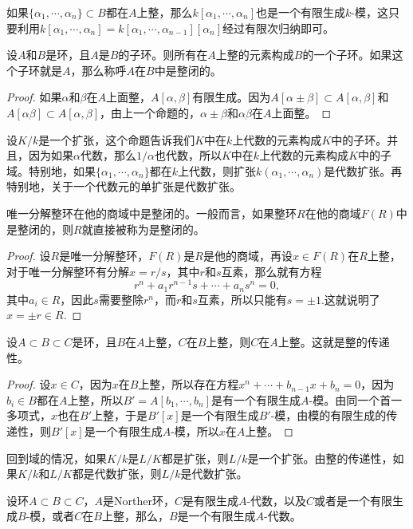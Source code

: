 如果$\{\alpha_1,\cdots,\alpha_n\}\subset B$都在$A$上整，那么$k[\alpha_1,\cdots,\alpha_n]$也是一个有限生成$k$-模，这只要利用$k[\alpha_1,\cdots,\alpha_n]=k[\alpha_1,\cdots,\alpha_{n-1}][\alpha_n]$经过有限次归纳即可。

\para \label{iope}设$A$和$B$是环，且$A$是$B$的子环。则所有在$A$上整的元素构成$B$的一个子环。如果这个子环就是$A$，那么称呼$A$在$B$中是整闭的。

\begin{proof} 如果$\alpha$和$\beta$在$A$上面整，$A[\alpha,\beta]$有限生成。因为$A[\alpha\pm\beta]\subset A[\alpha,\beta]$和$A[\alpha\beta]\subset A[\alpha,\beta]$，由上一个命题的，$\alpha\pm\beta$和$\alpha\beta$在$A$上面整。\end{proof}

设$K/k$是一个扩张，这个命题告诉我们$K$中在$k$上代数的元素构成$K$中的子环。并且，因为如果$\alpha$代数，那么$1/\alpha$也代数，所以$K$中在$k$上代数的元素构成$K$中的子域。特别地，如果$\{\alpha_1,\cdots,\alpha_n\}$都在$k$上代数，则扩张$k(\alpha_1,\cdots,\alpha_n)$是代数扩张。再特别地，关于一个代数元的单扩张是代数扩张。

\para 唯一分解整环在他的商域中是整闭的。一般而言，如果整环$R$在他的商域$F(R)$中是整闭的，则$R$就直接被称为是整闭的。

\begin{proof} 
	设$R$是唯一分解整环，$F(R)$是$R$是他的商域，再设$x\in F(R)$在$R$上整，对于唯一分解整环有分解$x=r/s$，其中$r$和$s$互素，那么就有方程
	\[
		r^n+a_1r^{n-1}s+\cdots+a_n s^n=0,
	\]
	其中$a_i\in R$，因此$s$需要整除$r^n$，而$r$和$s$互素，所以只能有$s=\pm 1$.这就说明了$x=\pm r\in R$.
\end{proof}

\begin{pro}
设$A\subset B\subset C$是环，且$B$在$A$上整，$C$在$B$上整，则$C$在$A$上整。这就是整的传递性。
\end{pro}

\begin{proof} 
	设$x\in C$，因为$x$在$B$上整，所以存在方程$x^n+\cdots+b_{n-1}x+b_n=0$，因为$b_i\in B$都在$A$上整，所以$B'=A[b_1,\cdots,b_n]$是有一个有限生成$A$-模。由同一个首一多项式，$x$也在$B'$上整，于是$B'[x]$是一个有限生成$B'$-模，由模的有限生成的传递性，则$B'[x]$是一个有限生成$A$-模，所以$x$在$A$上整。
\end{proof}

回到域的情况，如果$K/k$是$L/K$都是扩张，则$L/k$是一个扩张。由整的传递性，如果$K/k$和$L/K$都是代数扩张，则$L/k$是代数扩张。

\begin{pro}\label{p:2.4}
设环$A\subset B\subset C$，$A$是Norther环，$C$是有限生成$A$-代数，以及$C$或者是一个有限生成$B$-模，或者$C$在$B$上整，那么，$B$是一个有限生成$A$-代数。
\end{pro}

